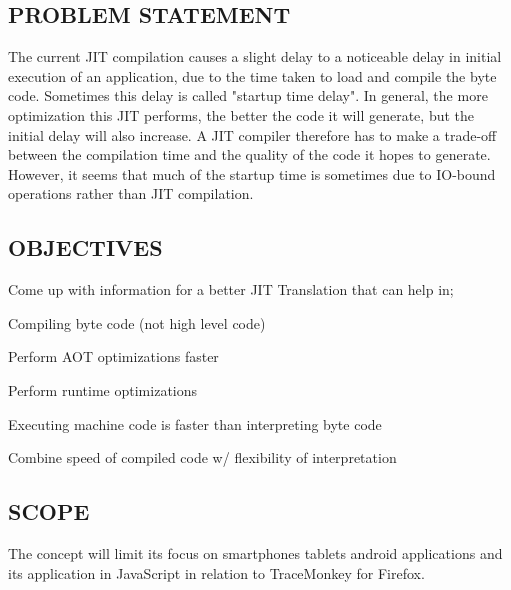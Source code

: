 \documentclass{article}
\begin{document}
\subsection{PROBLEM STATEMENT}{The current JIT compilation causes a slight delay to a noticeable delay in initial execution of an application, due to the time taken to load and compile the byte code. Sometimes this delay is called "startup time delay". In general, the more optimization this JIT performs, the better the code it will generate, but the initial delay will also increase. A JIT compiler therefore has to make a trade-off between the compilation time and the quality of the code it hopes to generate. However, it seems that much of the startup time is sometimes due to IO-bound operations rather than JIT compilation.}
\subsection{OBJECTIVES }{Come up with information for a better JIT Translation that can help in;
\itemize

\item Compiling byte code (not high level code) 

\item  Perform AOT optimizations faster 

\item Perform runtime optimizations 

\item Executing machine code is faster than interpreting byte code 

\item Combine speed of compiled code w/ flexibility of interpretation 
}
\subsection{SCOPE}{The concept will limit its focus on smartphones tablets android applications and its application in JavaScript in relation to TraceMonkey for Firefox.}
\end{document}
